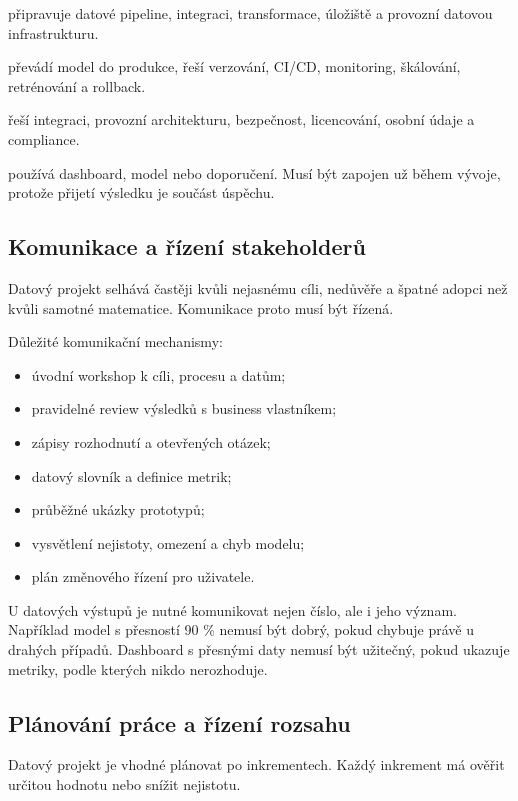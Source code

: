  připravuje datové pipeline, integraci, transformace, úložiště a provozní datovou infrastrukturu.

 převádí model do produkce, řeší verzování, CI/CD, monitoring, škálování, retrénování a rollback.

 řeší integraci, provozní architekturu, bezpečnost, licencování, osobní údaje a compliance.

 používá dashboard, model nebo doporučení. Musí být zapojen už během vývoje, protože přijetí výsledku je součást úspěchu.

\subsection{Komunikace a řízení stakeholderů}
Datový projekt selhává častěji kvůli nejasnému cíli, nedůvěře a špatné adopci než kvůli samotné matematice. Komunikace proto musí být řízená.

Důležité komunikační mechanismy:
\begin{itemize}
  \item úvodní workshop k cíli, procesu a datům;
  \item pravidelné review výsledků s business vlastníkem;
  \item zápisy rozhodnutí a otevřených otázek;
  \item datový slovník a definice metrik;
  \item průběžné ukázky prototypů;
  \item vysvětlení nejistoty, omezení a chyb modelu;
  \item plán změnového řízení pro uživatele.
\end{itemize}

U datových výstupů je nutné komunikovat nejen číslo, ale i jeho význam. Například model s přesností 90 \% nemusí být dobrý, pokud chybuje právě u drahých případů. Dashboard s přesnými daty nemusí být užitečný, pokud ukazuje metriky, podle kterých nikdo nerozhoduje.

\subsection{Plánování práce a řízení rozsahu}
Datový projekt je vhodné plánovat po inkrementech. Každý inkrement má ověřit určitou hodnotu nebo snížit nejistotu.

